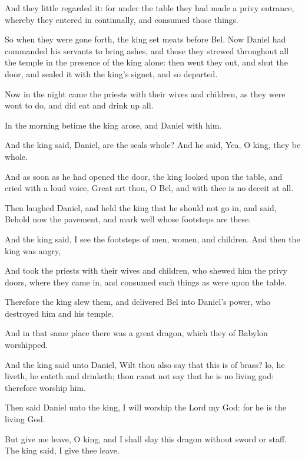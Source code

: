 {\par }{\PP {}And they little regarded it: for under the table they had made a privy entrance, whereby they entered in continually, and consumed those things.
\par }{\PP {}So when they were gone forth, the king set meats before Bel. Now Daniel had commanded his servants to bring ashes, and those they strewed throughout all the temple in the presence of the king alone: then went they out, and shut the door, and sealed it with the king’s signet, and so departed.
\par }{\PP {}Now in the night came the priests with their wives and children, as they were wont to do, and did eat and drink up all.
\par }{\PP {}In the morning betime the king arose, and Daniel with him.
\par }{\PP {}And the king said, Daniel, are the seals whole? And he said, Yea, O king, they be whole.
\par }{\PP {}And as soon as he had opened the door, the king looked upon the table, and cried with a loud voice, Great art thou, O Bel, and with thee is no deceit at all.
\par }{\PP {}Then laughed Daniel, and held the king that he should not go in, and said, Behold now the pavement, and mark well whose footsteps are these.
\par }{\PP {}And the king said, I see the footsteps of men, women, and children. And then the king was angry,
\par }{\PP {}And took the priests with their wives and children, who shewed him the privy doors, where they came in, and consumed such things as were upon the table.
\par }{\PP {}Therefore the king slew them, and delivered Bel into Daniel’s power, who destroyed him and his temple.
\par }{\PP {}And in that same place there was a great dragon, which they of Babylon worshipped.
\par }{\PP {}And the king said unto Daniel, Wilt thou also say that this is of brass? lo, he liveth, he eateth and drinketh; thou canst not say that he is no living god: therefore worship him.
\par }{\PP {}Then said Daniel unto the king, I will worship the Lord my God: for he is the living God.
\par }{\PP {}But give me leave, O king, and I shall slay this dragon without sword or staff. The king said, I give thee leave.
}
